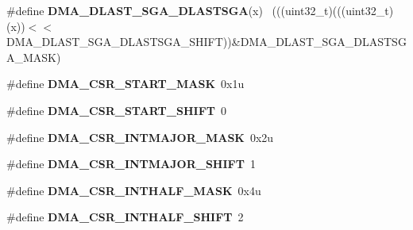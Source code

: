 \begin{DoxyCompactItemize}
\item 
\hypertarget{group___d_m_a___register___masks_ga9de76e0c6332b3cff5d05653ffadb172}{}\#define {\bfseries D\+M\+A\+\_\+\+D\+L\+A\+S\+T\+\_\+\+S\+G\+A\+\_\+\+D\+L\+A\+S\+T\+S\+G\+A}(x)                            ~(((uint32\+\_\+t)(((uint32\+\_\+t)(x))$<$$<$D\+M\+A\+\_\+\+D\+L\+A\+S\+T\+\_\+\+S\+G\+A\+\_\+\+D\+L\+A\+S\+T\+S\+G\+A\+\_\+\+S\+H\+I\+F\+T))\&D\+M\+A\+\_\+\+D\+L\+A\+S\+T\+\_\+\+S\+G\+A\+\_\+\+D\+L\+A\+S\+T\+S\+G\+A\+\_\+\+M\+A\+S\+K)\label{group___d_m_a___register___masks_ga9de76e0c6332b3cff5d05653ffadb172}

\item 
\hypertarget{group___d_m_a___register___masks_gac9356cdce4f3a2f7986ce84cbb0cd31f}{}\#define {\bfseries D\+M\+A\+\_\+\+C\+S\+R\+\_\+\+S\+T\+A\+R\+T\+\_\+\+M\+A\+S\+K}~0x1u\label{group___d_m_a___register___masks_gac9356cdce4f3a2f7986ce84cbb0cd31f}

\item 
\hypertarget{group___d_m_a___register___masks_ga195c81979f073c246c7cfd65eb5beeba}{}\#define {\bfseries D\+M\+A\+\_\+\+C\+S\+R\+\_\+\+S\+T\+A\+R\+T\+\_\+\+S\+H\+I\+F\+T}~0\label{group___d_m_a___register___masks_ga195c81979f073c246c7cfd65eb5beeba}

\item 
\hypertarget{group___d_m_a___register___masks_ga8d41b8ec510ae91e64c21d13721a272d}{}\#define {\bfseries D\+M\+A\+\_\+\+C\+S\+R\+\_\+\+I\+N\+T\+M\+A\+J\+O\+R\+\_\+\+M\+A\+S\+K}~0x2u\label{group___d_m_a___register___masks_ga8d41b8ec510ae91e64c21d13721a272d}

\item 
\hypertarget{group___d_m_a___register___masks_ga3e62ac93fd0c7b4f8a78612dc83d67a4}{}\#define {\bfseries D\+M\+A\+\_\+\+C\+S\+R\+\_\+\+I\+N\+T\+M\+A\+J\+O\+R\+\_\+\+S\+H\+I\+F\+T}~1\label{group___d_m_a___register___masks_ga3e62ac93fd0c7b4f8a78612dc83d67a4}

\item 
\hypertarget{group___d_m_a___register___masks_ga65d795eca7173289b56fc862abbf6703}{}\#define {\bfseries D\+M\+A\+\_\+\+C\+S\+R\+\_\+\+I\+N\+T\+H\+A\+L\+F\+\_\+\+M\+A\+S\+K}~0x4u\label{group___d_m_a___register___masks_ga65d795eca7173289b56fc862abbf6703}

\item 
\hypertarget{group___d_m_a___register___masks_ga72ab8889d41c8ab88cea74dcb81d0f00}{}\#define {\bfseries D\+M\+A\+\_\+\+C\+S\+R\+\_\+\+I\+N\+T\+H\+A\+L\+F\+\_\+\+S\+H\+I\+F\+T}~2\label{group___d_m_a___register___masks_ga72ab8889d41c8ab88cea74dcb81d0f00}


\end{DoxyCompactItemize}
